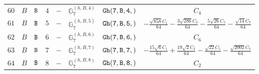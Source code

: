 \documentclass[fleqn,8pt]{jsarticle}
\begin{document}
\begin{table}[ht!]
\begin{center}
\begin{tabular}{cccccccc}
$ 60 $ & $ B $ & $ {\tt B} $ & $ 4 $ & $ - $ & $ \mathbb{G}_{7}^{(h,B,4)} $ & $ {\tt Gh(7,B,4,)} $ & $ C_{4} $ \\
$ 61 $ & $ B $ & $ {\tt B} $ & $ 5 $ & $ - $ & $ \mathbb{G}_{7}^{(h,B,5)} $ & $ {\tt Gh(7,B,5,)} $ & $ - \frac{\sqrt{858} C_{1}}{64} - \frac{3 \sqrt{286} C_{3}}{64} - \frac{5 \sqrt{26} C_{5}}{64} - \frac{\sqrt{14} C_{7}}{64} $ \\
$ 62 $ & $ B $ & $ {\tt B} $ & $ 6 $ & $ - $ & $ \mathbb{G}_{7}^{(h,B,6)} $ & $ {\tt Gh(7,B,6,)} $ & $ C_{6} $ \\
$ 63 $ & $ B $ & $ {\tt B} $ & $ 7 $ & $ - $ & $ \mathbb{G}_{7}^{(h,B,7)} $ & $ {\tt Gh(7,B,7,)} $ & $ - \frac{15 \sqrt{6} C_{1}}{64} + \frac{19 \sqrt{2} C_{3}}{64} - \frac{\sqrt{22} C_{5}}{64} - \frac{\sqrt{2002} C_{7}}{64} $ \\
$ 64 $ & $ B $ & $ {\tt B} $ & $ 8 $ & $ - $ & $ \mathbb{G}_{7}^{(h,B,8)} $ & $ {\tt Gh(7,B,8,)} $ & $ C_{2} $ \\
 \hline \hline
\end{tabular}
\end{center}
\end{table}
\end{document}
